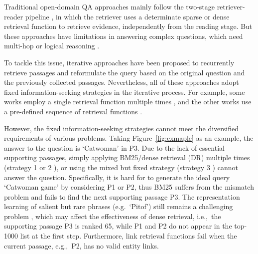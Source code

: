 \documentclass[11pt]{article}
\begin{document}
Traditional open-domain QA approaches mainly follow the two-stage retriever-reader pipeline \citep{chen-etal-2017-reading, yang-etal-2018-hotpotqa, karpukhin-etal-2020-dense}, in which the retriever uses a determinate sparse or dense retrieval function to retrieve evidence, independently from the reading stage. 
But these approaches have limitations in answering complex questions, which need multi-hop or logical reasoning \cite{xiong2021answering}. 

To tackle this issue, iterative approaches have been proposed to recurrently retrieve passages and reformulate the query based on the original question and the previously collected passages. 
Nevertheless, all of these approaches adopt fixed information-seeking strategies in the iterative process.
For example, some works employ a single retrieval function multiple times \citep{das2018multistep, qi-etal-2019-answering, xiong2021answering}, and the other works use a pre-defined sequence of retrieval functions \citep{Asai2020Learning, Dhingra2020Differentiable}.

However, the fixed information-seeking strategies cannot meet the diversified requirements of various problems. 
Taking Figure~\ref{fig:exmaple} as an example, the answer to the question is `Catwoman' in P3.
Due to the lack of essential supporting passages, simply applying BM25/dense retrieval (DR) multiple times (strategy 1 \citep{qi-etal-2019-answering} or 2 \citep{xiong2021answering}), or using the mixed but fixed strategy (strategy 3 \citep{Asai2020Learning}) cannot answer the question.
Specifically, it is hard for \citet{qi-etal-2019-answering} to generate the ideal query `Catwoman game' by considering P1 or P2, thus BM25 \citep{10.1561/1500000019} suffers from the mismatch problem and fails to find the next supporting passage P3.
The representation learning of salient but rare phrases (e.g.~`Pitof') still remains a challenging problem \citep{karpukhin-etal-2020-dense}, which may affect the effectiveness of dense retrieval, i.e.,~the supporting passage P3 is ranked 65, while P1 and P2 do not appear in the top-1000 list at the first step.
Furthermore, link retrieval functions fail when the current passage, e.g.,~P2, has no valid entity links.
\end{document}
